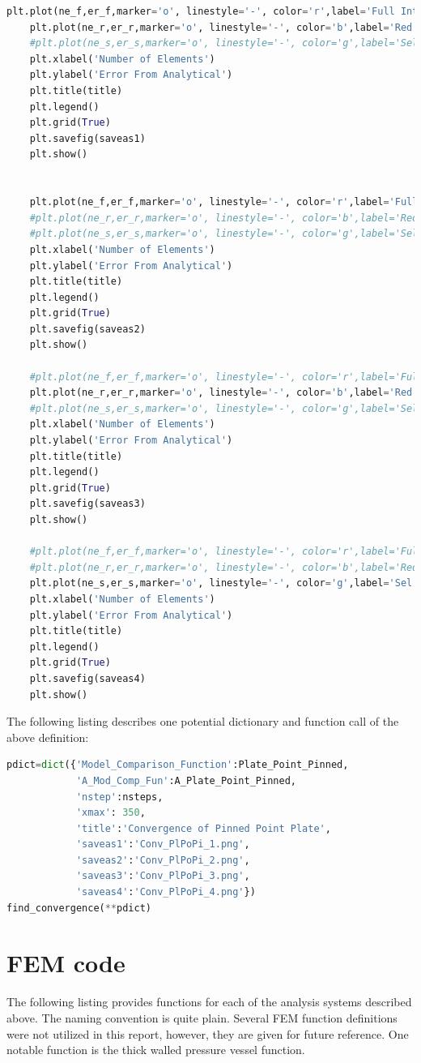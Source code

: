 \documentclass[10pt,letterpaper]{report}
\numberwithin{equation}{chapter}
\begin{document}
\begin{lstlisting}[language=Python]
    plt.plot(ne_f,er_f,marker='o', linestyle='-', color='r',label='Full Int')
    plt.plot(ne_r,er_r,marker='o', linestyle='-', color='b',label='Red Int')
    #plt.plot(ne_s,er_s,marker='o', linestyle='-', color='g',label='Sel Red Int')
    plt.xlabel('Number of Elements')
    plt.ylabel('Error From Analytical')
    plt.title(title)
    plt.legend()
    plt.grid(True)
    plt.savefig(saveas1)
    plt.show()
    
    
    plt.plot(ne_f,er_f,marker='o', linestyle='-', color='r',label='Full Int')
    #plt.plot(ne_r,er_r,marker='o', linestyle='-', color='b',label='Red Int')
    #plt.plot(ne_s,er_s,marker='o', linestyle='-', color='g',label='Sel Red Int')
    plt.xlabel('Number of Elements')
    plt.ylabel('Error From Analytical')
    plt.title(title)
    plt.legend()
    plt.grid(True)
    plt.savefig(saveas2)    
    plt.show()
    
    #plt.plot(ne_f,er_f,marker='o', linestyle='-', color='r',label='Full Int')
    plt.plot(ne_r,er_r,marker='o', linestyle='-', color='b',label='Red Int')
    #plt.plot(ne_s,er_s,marker='o', linestyle='-', color='g',label='Sel Red Int')
    plt.xlabel('Number of Elements')
    plt.ylabel('Error From Analytical')
    plt.title(title)
    plt.legend()
    plt.grid(True)
    plt.savefig(saveas3)    
    plt.show()
    
    #plt.plot(ne_f,er_f,marker='o', linestyle='-', color='r',label='Full Int')
    #plt.plot(ne_r,er_r,marker='o', linestyle='-', color='b',label='Red Int')
    plt.plot(ne_s,er_s,marker='o', linestyle='-', color='g',label='Sel Red Int')
    plt.xlabel('Number of Elements')
    plt.ylabel('Error From Analytical')
    plt.title(title)
    plt.legend()
    plt.grid(True)
    plt.savefig(saveas4)    
    plt.show()
\end{lstlisting}

The following listing describes one potential dictionary and function call of the above definition:
\begin{lstlisting}[language=Python]
pdict=dict({'Model_Comparison_Function':Plate_Point_Pinned,
            'A_Mod_Comp_Fun':A_Plate_Point_Pinned,
            'nstep':nsteps,
            'xmax': 350,
            'title':'Convergence of Pinned Point Plate',
            'saveas1':'Conv_PlPoPi_1.png',
            'saveas2':'Conv_PlPoPi_2.png',
            'saveas3':'Conv_PlPoPi_3.png',
            'saveas4':'Conv_PlPoPi_4.png'})
find_convergence(**pdict)
\end{lstlisting}
\section{FEM code}
The following listing provides functions for each of the analysis systems described above. The naming convention is quite plain. Several FEM function definitions were not utilized in this report, however, they are given for future reference. One notable function is the thick walled pressure vessel function.
\end{document}
